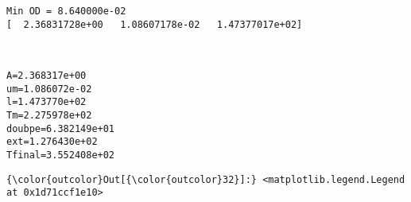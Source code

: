 \documentclass[11pt]{article}
\begin{document}
    \begin{Verbatim}[commandchars=\\\{\}]
Min OD = 8.640000e-02
[  2.36831728e+00   1.08607178e-02   1.47377017e+02]

    \end{Verbatim}

    \begin{center}
    \end{center}
    { \hspace*{\fill} \\}
    
    \begin{Verbatim}[commandchars=\\\{\}]
A=2.368317e+00
um=1.086072e-02
l=1.473770e+02
Tm=2.275978e+02
doubpe=6.382149e+01
ext=1.276430e+02
Tfinal=3.552408e+02

    \end{Verbatim}

            \begin{Verbatim}[commandchars=\\\{\}]
{\color{outcolor}Out[{\color{outcolor}32}]:} <matplotlib.legend.Legend at 0x1d71ccf1e10>
\end{Verbatim}
        
    \begin{center}
    \end{center}
    { \hspace*{\fill} \\}
    
    \begin{center}
    \end{center}
    { \hspace*{\fill} \\}
    
\end{document}
